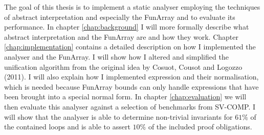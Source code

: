 The goal of this thesis is to implement a static analyser employing the techniques of abstract interpretation and especially the FunArray and to evaluate its performance. In chapter \ref{chap:background} I will more formally describe what abstract interpretation and the FunArray are and how they work. Chapter \ref{chap:implementation} contains a detailed description on how I implemented the analyser and the FunArray. I will show how I altered and simplified the unification algorithm from the original idea by Cosuot, Cousot and Logozzo (2011). I will also explain how I implemented expression and their normalisation, which is needed because FunArray bounds can only handle expressions that have been brought into a special normal form. In chapter \ref{chap:evaluation} we will then evaluate this analyser against a selection of benchmarks from SV-COMP. I will show that the analyser is able to determine non-trivial invariants for $61\%$ of the contained loops and is able to assert $10\%$ of the included proof obligations.



















 